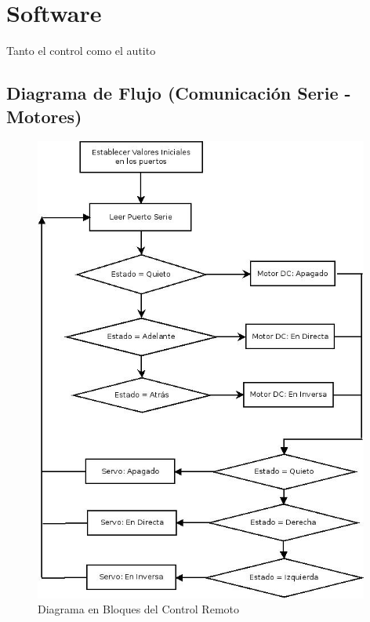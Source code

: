 \documentclass[a4paper,10pt]{article}
\begin{document}
		\section{Software}
			Tanto el control como el autito 
			\subsection{Diagrama de Flujo (Comunicación Serie - Motores)}
				\begin{figure}[!htb]
						\centering
						\includegraphics[width=11cm]{Imagenes/DiagramaFlujoAutito.jpeg}
						\caption{Diagrama en Bloques del Control Remoto} \label{img003}
					\end{figure}
\end{document}

